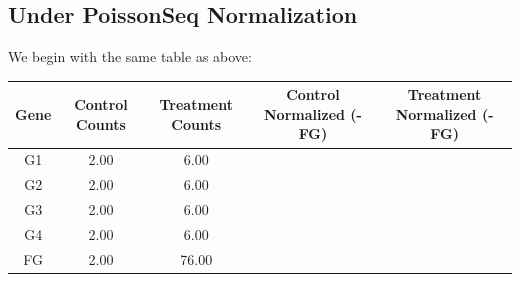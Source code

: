 \documentclass[10pt]{article}
\begin{document}
\subsection*{Under PoissonSeq Normalization}
We begin with the same table as above:\\
\begin{tabular}{| c | c | c | c | c |}
    \hline
    Gene & Control Counts & Treatment Counts & Control Normalized (-FG) & Treatment Normalized (-FG) \\
    \hline
    G1 & 2.00 & 6.00 & & \\
    G2 & 2.00 & 6.00 & & \\
    G3 & 2.00 & 6.00 & & \\
    G4 & 2.00 & 6.00 & & \\
    FG & 2.00 & 76.00 & & \\
    \hline
\end{tabular}\\
\end{document}

